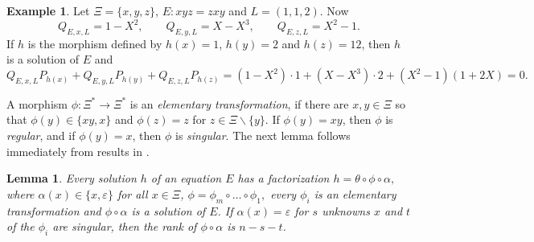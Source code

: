 \documentclass[submission]{eptcs}
\newtheorem{lemma}[theorem]{Lemma}
\theoremstyle{definition}
\newtheorem{example}[theorem]{Example}
\newcommand{\eps}{\varepsilon}
\newcommand{\px}[1]{ P_{#1} }
\newcommand{\qx}[3]{ Q_{#1,#2,#3} }
\begin{document}
\begin{example}
Let $\Xi = \{x,y,z\}$, $E: xyz = zxy$ and $L = (1, 1, 2)$. Now
\begin{equation*}
    \qx{E}{x}{L} = 1 - X^2, \qquad
    \qx{E}{y}{L} = X - X^3, \qquad
    \qx{E}{z}{L} = X^2 - 1.
\end{equation*}
If $h$ is the morphism defined by $h(x) = 1$, $h(y) = 2$ and $h(z) =
12$, then $h$ is a solution of $E$ and
\begin{equation*}
    \qx{E}{x}{L} \px{h(x)} + \qx{E}{y}{L} \px{h(y)}
        + \qx{E}{z}{L} \px{h(z)}
    = (1 - X^2) \cdot 1 + (X - X^3) \cdot 2 + (X^2 - 1) (1 + 2X)
    = 0.
\end{equation*}
\end{example}

A morphism $\phi: \Xi^* \to \Xi^*$ is an \emph{elementary
transformation}, if there are $x, y \in \Xi$ so that $\phi(y) \in
\{xy, x\}$ and $\phi(z) = z$ for $z \in \Xi \smallsetminus \{y\}$.
If $\phi(y) = xy$, then $\phi$ is \emph{regular}, and if $\phi(y) =
x$, then $\phi$ is \emph{singular}. The next lemma follows
immediately from results in \cite{Lo83}.

\begin{lemma} \label{lem:elemtrans}
Every solution $h$ of an equation $E$ has a factorization
\begin{math}
    h = \theta \circ \phi \circ \alpha,
\end{math}
where $\alpha(x) \in \{x, \eps\}$ for all $x \in \Xi$,
\begin{math}
    \phi = \phi_m \circ \dots \circ \phi_1,
\end{math}
every $\phi_i$ is an elementary transformation and $\phi \circ
\alpha$ is a solution of $E$. If $\alpha(x) = \eps$ for $s$ unknowns
$x$ and $t$ of the $\phi_i$ are singular, then the rank of $\phi
\circ \alpha$ is $n-s-t$.
\end{lemma}
\end{document}
